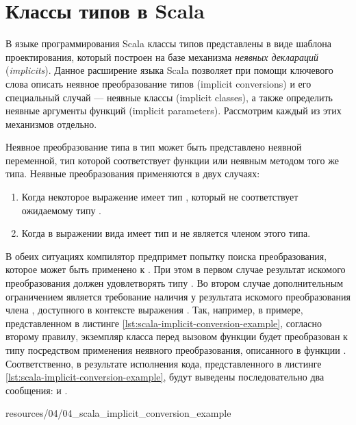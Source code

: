 \section{Классы типов в Scala}

В языке программирования Scala классы типов представлены в виде шаблона проектирования, который построен на базе механизма \emph{неявных деклараций} (\emph{implicits}). Данное расширение языка Scala позволяет при помощи ключевого слова  описать неявное преобразование типов (implicit conversions) и его специальный случай --- неявные классы (implicit classes), а также определить неявные аргументы функций (implicit parameters). Рассмотрим каждый из этих механизмов отдельно.

Неявное преобразование типа  в тип  может быть представлено неявной переменной, тип которой соответствует функции  или неявным методом того же типа. Неявные преобразования применяются в двух случаях:
\begin{enumerate}
	\item Когда некоторое выражение  имеет тип , который не соответствует ожидаемому типу .
	\item Когда в выражении вида   имеет тип  и  не является членом этого типа. 
\end{enumerate}
В обеих ситуациях компилятор предпримет попытку поиска преобразования, которое может быть применено к . При этом в первом случае результат искомого преобразования должен удовлетворять типу . Во втором случае дополнительным ограничением является требование наличия у результата искомого преобразования члена , доступного в контексте выражения . Так, например, в примере, представленном в листинге \ref{lst:scala-implicit-conversion-example}, согласно второму правилу, экземпляр класса   перед вызовом функции  будет преобразован к типу  посредством применения неявного преобразования, описанного в функции . Соответственно, в результате исполнения кода, представленного в листинге  \ref{lst:scala-implicit-conversion-example}, будут выведены последовательно два сообщения:  и .


{resources/04/04_scala_implicit_conversion_example}

